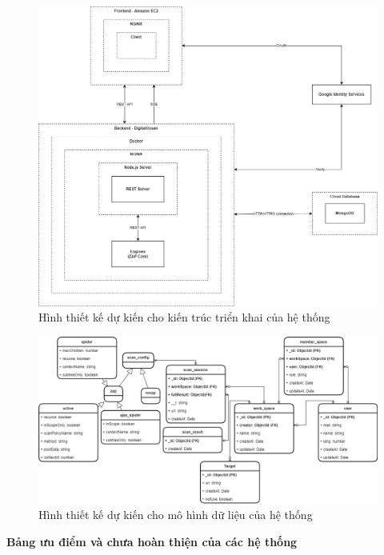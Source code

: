 \newpage
{}

\begin{figure}[H]
    \centering
    \includegraphics[width=\textwidth]{images/diagram/diagram_04112023/ZAPOP Architecture.png}
    \caption{Hình thiết kế dự kiến cho kiến trúc triển khai của hệ thống}
\end{figure}

\newpage
{}

\begin{figure}[H]
    \centering
    \includegraphics[width=\textwidth]{images/diagram/diagram_25102022/Database Diagram.png}
    \caption{Hình thiết kế dự kiến cho mô hình dữ liệu của hệ thống}
\end{figure}

\textbf{Bảng ưu điểm và chưa hoàn thiện của các hệ thống}

